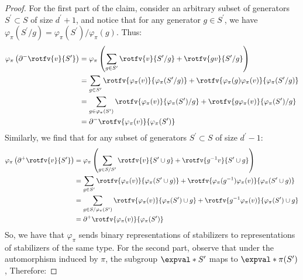 \begin{proof}
  For the first part of the claim, consider an arbitrary subset of generators $S^{\prime} \subset S$ of size $d^{\prime}+1$, and notice that for any generator $g \in S^{\prime}$, we have $\varphi_{\pi}(S^{\prime}/g) = \varphi_{\pi}(S^{\prime}) / \varphi_{\pi}(g)$. Thus:
\begin{equation*}
  \begin{split}
      \varphi_{\pi} \left( \partial^{-}  \rotfv{v}{S^{\prime}} \right) &=  \varphi_{\pi}\left( \sum_{g\in S^{\prime}} \rotfv{v}{S^{\prime}/g} +  \rotfv{gv}{S^{\prime}/g}  \right) \\
      & = \sum_{g\in S^{\prime}} \rotfv{\varphi_{\pi}(v)}{ \varphi_{\pi}(S^{\prime} / g)} +  \rotfv{\varphi_{\pi}(g)\varphi_{\pi}(v)}{\varphi_{\pi}(S^{\prime} / g) }  \\ 
      & = \sum_{g\in \varphi_{\pi}(S^{\prime})} \rotfv{\varphi_{\pi}(v)}{ \varphi_{\pi}(S^{\prime})/g} +  \rotfv{g\varphi_{\pi}(v)}{\varphi_{\pi}(S^{\prime})/g }  \\ 
      &= \partial^{-} \rotfv{\varphi_{\pi}(v)}{\varphi_{\pi}(S^{\prime})}
  \end{split}
\end{equation*}
Similarly, we find that for any subset of generators $S^{\prime} \subset S$ of size $d^{\prime}-1$:
\begin{equation*}
  \begin{split}
    \varphi_{\pi} \left( \partial^{+}  \rotfv{v}{S^{\prime}} \right) &=  \varphi_{\pi}\left( \sum_{g\in S/S^{\prime}} \rotfv{v}{S^{\prime} \cup g} +  \rotfv{g^{-1}v}{S^{\prime} \cup g}  \right) \\
    & = \sum_{g\in S^{\prime}} \rotfv{\varphi_{\pi}(v)}{ \varphi_{\pi}(S^{\prime} \cup g)} +  \rotfv{\varphi_{\pi}(g^{-1})\varphi_{\pi}(v)}{\varphi_{\pi}(S^{\prime} \cup g) }  \\ 
    & = \sum_{g\in S/\varphi_{\pi}(S^{\prime})} \rotfv{\varphi_{\pi}(v)}{ \varphi_{\pi}(S^{\prime})\cup g} +  \rotfv{g^{-1}\varphi_{\pi}(v)}{\varphi_{\pi}(S^{\prime})\cup g }  \\ 
      &= \partial^{+} \rotfv{\varphi_{\pi}(v)}{\varphi_{\pi}(S^{\prime})}
  \end{split}
\end{equation*}
So, we have that $\varphi_{\pi}$ sends binary representations of stabilizers to representations of stabilizers of the same type. For the second part, observe that under the automorphism induced by $\pi$, the subgroup $\expval*{S^{\prime}}$ maps to $\expval*{\pi(S^{\prime})}$, Therefore: 

\end{proof}
